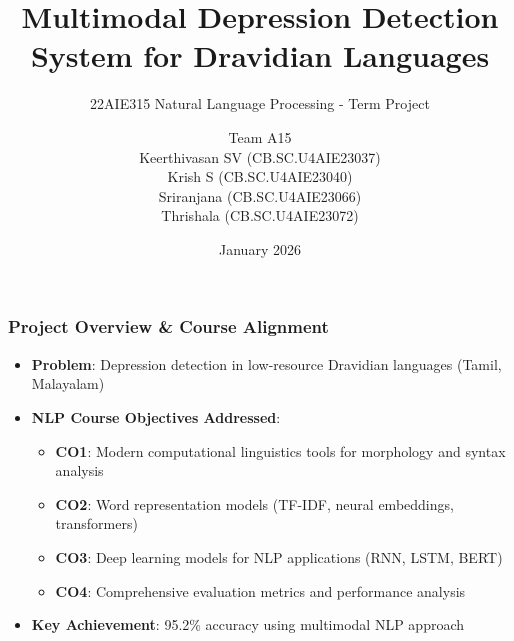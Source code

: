\documentclass{beamer}
\title[Multimodal Depression Detection]{Multimodal Depression Detection System for Dravidian Languages}
\subtitle{22AIE315 Natural Language Processing - Term Project}
\author[Team A15]{
Team A15\\[0.4em]
Keerthivasan SV (CB.SC.U4AIE23037)\\
Krish S (CB.SC.U4AIE23040)\\
Sriranjana (CB.SC.U4AIE23066)\\
Thrishala (CB.SC.U4AIE23072)
}
\date{January 2026}
\begin{document}
\begin{frame}
\titlepage
\end{frame}

\begin{frame}
\frametitle{Project Overview \& Course Alignment}
\begin{itemize}
    \item \textbf{Problem}: Depression detection in low-resource Dravidian languages (Tamil, Malayalam)
    \item \textbf{NLP Course Objectives Addressed}:
    \begin{itemize}
        \item \textbf{CO1}: Modern computational linguistics tools for morphology and syntax analysis
        \item \textbf{CO2}: Word representation models (TF-IDF, neural embeddings, transformers)
        \item \textbf{CO3}: Deep learning models for NLP applications (RNN, LSTM, BERT)
        \item \textbf{CO4}: Comprehensive evaluation metrics and performance analysis
    \end{itemize}
    \item \textbf{Key Achievement}: 95.2\% accuracy using multimodal NLP approach
\end{itemize}
\end{frame}
\end{document}

